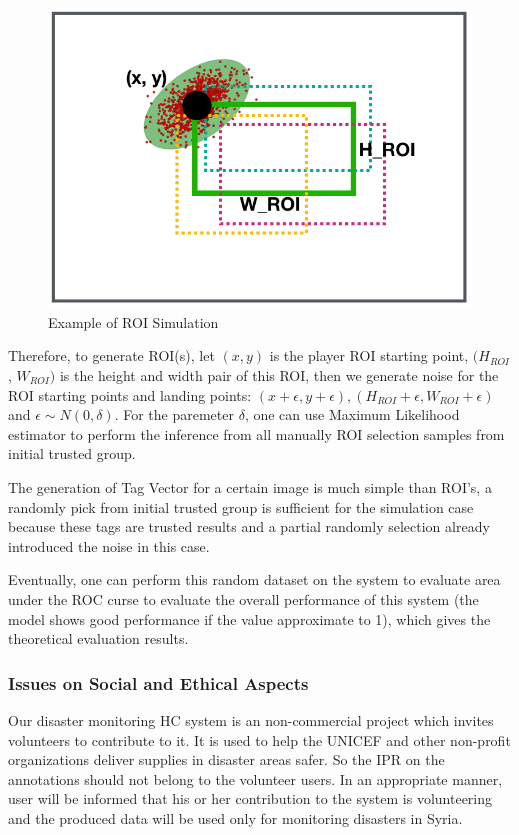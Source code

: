 \begin{figure}[htp]
\centering
\includegraphics[width=0.5\columnwidth]{figures/evaluation}
\caption{Example of ROI Simulation}
\label{fig:evaluation}
\end{figure}

Therefore, to generate ROI(s), let $(x, y)$ is the player ROI starting point, $(H_{ROI}$, $W_{ROI})$ is the height
and width pair of this ROI, then we generate noise for the ROI starting points and landing points: 
$(x+\epsilon, y+\epsilon), (H_{ROI}+\epsilon, W_{ROI}+\epsilon)$ and $\epsilon \sim N(0, \delta)$.
For the paremeter $\delta$, one can use Maximum Likelihood estimator \cite{johansen1990maximum} 
to perform the inference from all manually ROI selection samples from initial trusted group.

The generation of Tag Vector for a certain image is much simple than ROI's, 
a randomly pick from initial trusted group is sufficient for the simulation case 
because these tags are trusted results and a partial randomly selection already introduced the noise in this case.

Eventually, one can perform this random dataset on the system to evaluate area under the ROC curse to
evaluate the overall performance of this system (the model shows good performance if the value approximate to 1), 
which gives the theoretical evaluation results.

\subsubsection{Issues on Social and Ethical Aspects}
\label{chapter:ethical}

Our disaster monitoring HC system is an non-commercial project which invites volunteers to contribute to it. 
It is used to help the UNICEF and other non-profit organizations deliver supplies in disaster areas safer. 
So the IPR on the annotations should not belong to the volunteer users. In an appropriate manner, user will be informed that 
his or her contribution to the system is volunteering and the produced data will be used only for 
monitoring disasters in Syria.

